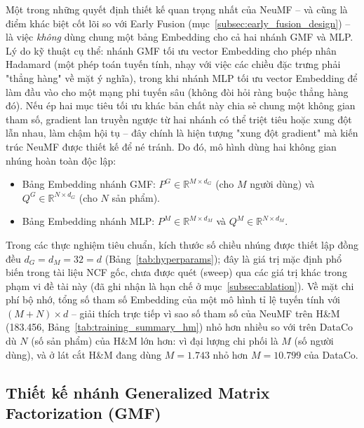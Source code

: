 Một trong những quyết định thiết kế quan trọng nhất của NeuMF -- và cũng là điểm khác biệt cốt lõi so với Early Fusion (mục~\ref{subsec:early_fusion_design}) -- là việc \emph{không} dùng chung một bảng Embedding cho cả hai nhánh GMF và MLP. Lý do kỹ thuật cụ thể: nhánh GMF tối ưu vector Embedding cho phép nhân Hadamard (một phép toán tuyến tính, nhạy với việc các chiều đặc trưng phải "thẳng hàng" về mặt ý nghĩa), trong khi nhánh MLP tối ưu vector Embedding để làm đầu vào cho một mạng phi tuyến sâu (không đòi hỏi ràng buộc thẳng hàng đó). Nếu ép hai mục tiêu tối ưu khác bản chất này chia sẻ chung một không gian tham số, gradient lan truyền ngược từ hai nhánh có thể triệt tiêu hoặc xung đột lẫn nhau, làm chậm hội tụ -- đây chính là hiện tượng "xung đột gradient" mà kiến trúc NeuMF được thiết kế để né tránh. Do đó, mô hình dùng hai không gian nhúng hoàn toàn độc lập:
\begin{itemize}
    \item Bảng Embedding nhánh GMF: $P^G \in \mathbb{R}^{M \times d_G}$ (cho $M$ người dùng) và $Q^G \in \mathbb{R}^{N \times d_G}$ (cho $N$ sản phẩm).
    \item Bảng Embedding nhánh MLP: $P^M \in \mathbb{R}^{M \times d_M}$ và $Q^M \in \mathbb{R}^{N \times d_M}$.
\end{itemize}
Trong các thực nghiệm tiêu chuẩn, kích thước số chiều nhúng được thiết lập đồng đều $d_G = d_M = 32 = d$ (Bảng~\ref{tab:hyperparams}); đây là giá trị mặc định phổ biến trong tài liệu NCF gốc, chưa được quét (sweep) qua các giá trị khác trong phạm vi đề tài này (đã ghi nhận là hạn chế ở mục~\ref{subsec:ablation}). Về mặt chi phí bộ nhớ, tổng số tham số Embedding của một mô hình tỉ lệ tuyến tính với $(M+N) \times d$ -- giải thích trực tiếp vì sao số tham số của NeuMF trên H\&M (183.456, Bảng~\ref{tab:training_summary_hm}) nhỏ hơn nhiều so với trên DataCo dù $N$ (số sản phẩm) của H\&M lớn hơn: vì đại lượng chi phối là $M$ (số người dùng), và ở lát cắt H\&M đang dùng $M=1.743$ nhỏ hơn $M=10.799$ của DataCo.

\subsection{Thiết kế nhánh Generalized Matrix Factorization (GMF)}
\label{subsec:gmf_design}

